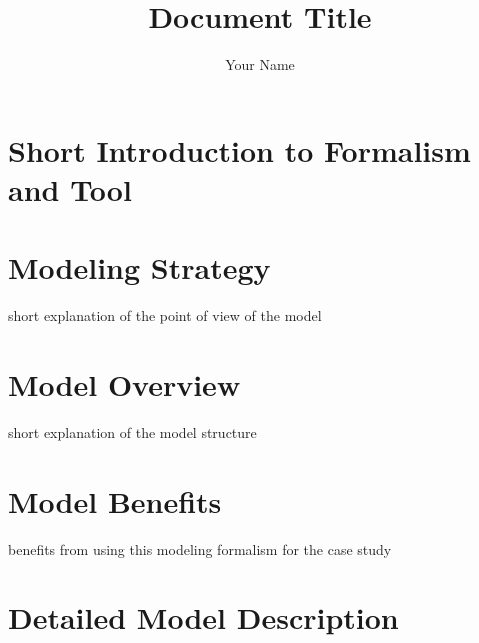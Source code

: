 \documentclass{template/openetcs_article}
\begin{document}
\frontmatter
{}





\author{Your Name}


\title{Document Title}




\maketitle
\tableofcontents
\listoffiguresandtables
\newpage

\section{Short Introduction to Formalism and Tool}
\label{sec:short-intr-form}

\section{Modeling Strategy}
\label{sec:modeling-strategy}

short explanation of the point of view of the model

\section{Model Overview}
\label{sec:model-overview}

short explanation of the model structure

\section{Model Benefits}
\label{sec:model-highlights}

benefits from using this modeling formalism for the case study

\section{Detailed Model Description}
\label{sec:deta-model-descr}
\end{document}
